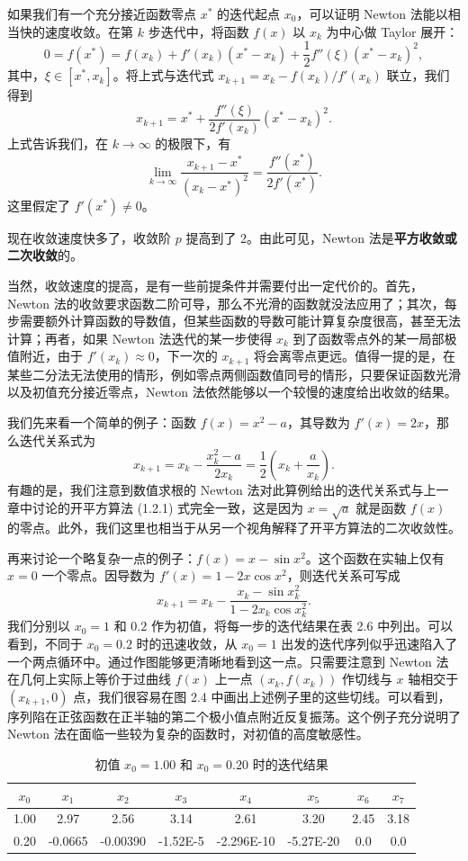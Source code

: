 如果我们有一个充分接近函数零点 $x^*$ 的迭代起点 $x_0$，可以证明 Newton 法能以相当快的速度收敛。在第 $k$ 步迭代中，将函数 $f(x)$ 以 $x_k$ 为中心做 Taylor 展开：
\[
0=f(x^*)=f(x_k)+f'(x_k)(x^*-x_k)+\frac12f''(\xi)(x^*-x_k)^2,
\]
其中，$\xi\in[x^*,x_k]$。将上式与迭代式 $x_{k+1}=x_k-f(x_k)/f'(x_k)$ 联立，我们得到
\[
x_{k+1}=x^*+\frac{f''(\xi)}{2f'(x_k)}(x^*-x_k)^2.
\]
上式告诉我们，在 $k\to\infty$ 的极限下，有
\[
\lim_{k\to\infty}\frac{x_{k+1}-x^*}{(x_k-x^*)^2}=\frac{f''(x^*)}{2f'(x^*)}.
\]
这里假定了 $f'(x^*)\ne0$。

现在收敛速度快多了，收敛阶 $p$ 提高到了 2。由此可见，Newton 法是\textbf{平方收敛或二次收敛}的。

当然，收敛速度的提高，是有一些前提条件并需要付出一定代价的。首先，Newton 法的收敛要求函数二阶可导，那么不光滑的函数就没法应用了；其次，每步需要额外计算函数的导数值，但某些函数的导数可能计算复杂度很高，甚至无法计算；再者，如果 Newton 法迭代的某一步使得 $x_k$ 到了函数零点外的某一局部极值附近，由于 $f'(x_k)\approx0$，下一次的 $x_{k+1}$ 将会离零点更远。值得一提的是，在某些二分法无法使用的情形，例如零点两侧函数值同号的情形，只要保证函数光滑以及初值充分接近零点，Newton 法依然能够以一个较慢的速度给出收敛的结果。

我们先来看一个简单的例子：函数 $f(x)=x^2-a$，其导数为 $f'(x)=2x$，那么迭代关系式为
\[
x_{k+1}=x_k-\frac{x_k^2-a}{2x_k}=\frac12\left(x_k+\frac a{x_k}\right).
\]
有趣的是，我们注意到数值求根的 Newton 法对此算例给出的迭代关系式与上一章中讨论的开平方算法 (1.2.1) 式完全一致，这是因为 $x=\sqrt a$ 就是函数 $f(x)$ 的零点。此外，我们这里也相当于从另一个视角解释了开平方算法的二次收敛性。

再来讨论一个略复杂一点的例子：$f(x)=x-\sin x^2$。这个函数在实轴上仅有 $x=0$ 一个零点。因导数为 $f'(x)=1-2x\cos x^2$，则迭代关系可写成
\[
x_{k+1}=x_k-\frac{x_k-\sin x_k^2}{1-2x_k\cos x_k^2}.
\]
我们分别以 $x_0=1$ 和 $0.2$ 作为初值，将每一步的迭代结果在表 2.6 中列出。可以看到，不同于 $x_0=0.2$ 时的迅速收敛，从 $x_0=1$ 出发的迭代序列似乎迅速陷入了一个两点循环中。通过作图能够更清晰地看到这一点。只需要注意到 Newton 法在几何上实际上等价于过曲线 $f(x)$ 上一点 $(x_k,f(x_k))$ 作切线与 $x$ 轴相交于 $(x_{k+1},0)$ 点，我们很容易在图 2.4 中画出上述例子里的这些切线。可以看到，序列陷在正弦函数在正半轴的第二个极小值点附近反复振荡。这个例子充分说明了 Newton 法在面临一些较为复杂的函数时，对初值的高度敏感性。

\begin{table}[htbp]
\centering
\caption{初值 $x_0=1.00$ 和 $x_0=0.20$ 时的迭代结果}
\label{tab:newton-init}
\small
\begin{tabular}{c*{7}{c}}
\toprule
$x_0$&$x_1$&$x_2$&$x_3$&$x_4$&$x_5$&$x_6$&$x_7$\\
\midrule
1.00&2.97&2.56&3.14&2.61&3.20&2.45&3.18\\
0.20&-0.0665&-0.00390&-1.52E-5&-2.296E-10&-5.27E-20&0.0&0.0\\
\bottomrule
\end{tabular}
\end{table}

